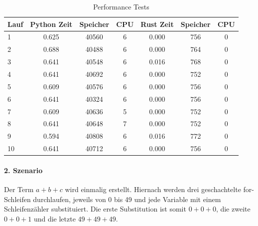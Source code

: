 \documentclass[11pt,a4paper, ngerman]{article}
\begin{document}
\begin{table}[ht!]
    \caption{Performance Tests}
    \centering
    \begin{tabular}{|l|c|c|c|c|c|c|}
        \hline
        \textbf{Lauf} & \textbf{Python Zeit} & \textbf{Speicher} & \textbf{CPU} & \textbf{Rust Zeit} & \textbf{Speicher} & \textbf{CPU} \\
        \hline
        1 & 0.625 & 40560 & 6 & 0.000 & 756 & 0 \\
        \hline
        2 & 0.688 & 40488 & 6 & 0.000 & 764 & 0 \\
        \hline
        3 & 0.641 & 40548 & 6 & 0.016 & 768 & 0 \\
        \hline
        4 & 0.641 & 40692 & 6 & 0.000 & 752 & 0 \\
        \hline
        5 & 0.609 & 40576 & 6 & 0.000 & 756 & 0 \\
        \hline
        6 & 0.641 & 40324 & 6 & 0.000 & 756 & 0 \\
        \hline
        7 & 0.609 & 40636 & 5 & 0.000 & 752 & 0 \\
        \hline
        8 & 0.641 & 40648 & 7 & 0.000 & 752 & 0 \\
        \hline
        9 & 0.594 & 40808 & 6 & 0.016 & 772 & 0 \\
        \hline
        10 & 0.641 & 40712 & 6 & 0.000 & 756 & 0 \\
        \hline
    \end{tabular}
\end{table}

\paragraph{2. Szenario} Der Term $a+b+c$ wird einmalig erstellt. Hiernach werden drei geschachtelte for-Schleifen durchlaufen, jeweils von 0 bis 49 und jede Variable mit einem Schleifenzähler substituiert. Die erste Substitution ist somit $0+0+0$, die zweite $0+0+1$ und die letzte $49+49+49$.
\end{document}
